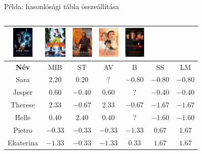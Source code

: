 \documentclass[english, aspectratio=169]{beamer}
\begin{document}
\begin{frame}{Példa: hasonlósági tábla összeállítása}
\begin{columns}
\begin{column}{.8\textwidth}
\begin{center}
\begin{footnotesize}
\begin{tabular}{|c|c|c|c|c|c|c|}
\includegraphics[height=1.5cm, keepaspectratio]{images/movies/star_trek.png} &
\includegraphics[height=1.5cm, keepaspectratio]{images/movies/ace_ventura.png} &
\includegraphics[height=1.5cm, keepaspectratio]{images/movies/braveheart.png} &
\includegraphics[height=1.5cm, keepaspectratio]{images/movies/sense_and_sensibility.png} &
\includegraphics[height=1.5cm, keepaspectratio]{images/movies/les_miserables.png} \\
\hline
\textbf{Név} & MIB & ST & AV & B & SS & LM\\ 
\hline
Sara & $2.20$ & $0.20$ & ? & $-0.80$ & $-0.80$ & $-0.80$\\ 
\hline
Jesper & $0.60$ & $-0.40$ & $0.60$ & ? & $-0.40$ & $-0.40$\\ 
\hline
Therese & $2.33$ & $-0.67$ & $2.33$ & $-0.67$ & $-1.67$ & $-1.67$\\ 
\hline
Helle & $0.40$ & $2.40$ & $0.40$ & ? & $-1.60$ & $-1.60$\\ 
\hline
Pietro & $-0.33$ & $-0.33$ & $-0.33$ & $-1.33$ & $0.67$ & $1.67$\\ 
\hline
Ekaterina & $-1.33$ & $-0.33$ & $-1.33$ & $0.33$ & $1.67$ & $1.67$\\ 
\hline
\end{tabular}
\end{footnotesize}
\end{center}
\end{column}
\end{columns}
\end{frame}
\end{document}
